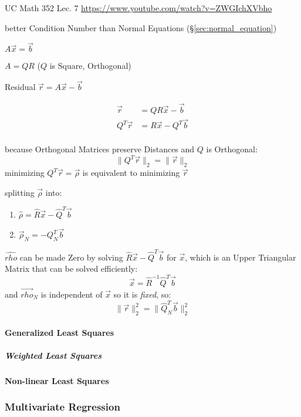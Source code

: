 UC Math 352 Lec. 7 \url{https://www.youtube.com/watch?v=ZWGIchXVbho}

better Condition Number than Normal Equations (\S\ref{sec:normal_equation})

$A\vec{x} = \vec{b}$

$A = QR$ ($Q$ is Square, Orthogonal)

Residual $\vec{r} = A\vec{x} - \vec{b}$

\begin{align*}
     \vec{r} & = QR\vec{x} - \vec{b} \\
  Q^T\vec{r} & = R\vec{x} - Q^T\vec{b} \\
\end{align*}

because Orthogonal Matrices preserve Distances and $Q$ is Orthogonal:
\[
  \|Q^T\vec{r}\|_2 = \|\vec{r}\|_2
\]
minimizing $Q^T\vec{r} = \vec{\rho}$ is equivalent to minimizing $\vec{r}$

splitting $\vec{\rho}$ into:
\begin{enumerate}
  \item $\hat{\rho}   = \hat{R}\vec{x} - \hat{Q}^T\vec{b}$
  \item $\vec{\rho}_N = -Q_N^T\vec{b}$
\end{enumerate}
$\hat{rho}$ can be made Zero by solving $\hat{R}\vec{x} - \hat{Q}^T\vec{b}$ for
$\vec{x}$, which is an Upper Triangular Matrix that can be solved efficiently:
\[
  \vec{x} = \hat{R}^{-1}\hat{Q}^T\vec{b}
\]
and $\vec{rho}_N$ is independent of $\vec{x}$ so it is \emph{fixed}, so:
\[
  \|\vec{r}\|^2_2 = \|\hat{Q}_N^T\vec{b}\|_2^2
\]



\paragraph{Generalized Least Squares}\label{sec:generalized_least_squares}\hfill

\subparagraph{Weighted Least Squares}\label{sec:weighted_least_squares}\hfill



\paragraph{Non-linear Least Squares}\label{sec:nonlinear_least_squares}\hfill



\subsubsection{Multivariate Regression}\label{sec:multivariate_regression}


